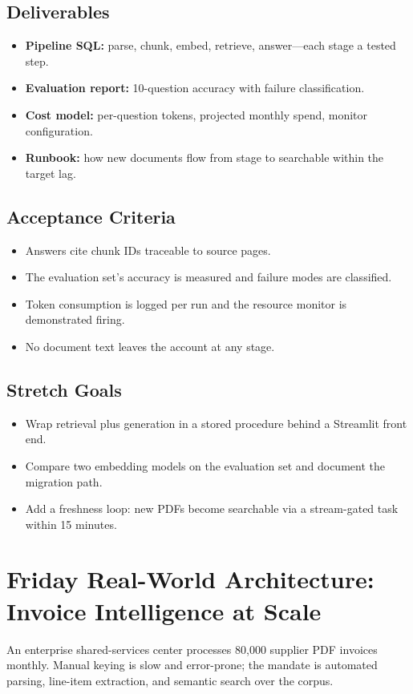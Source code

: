\subsection*{Deliverables}
\begin{itemize}
    \item \textbf{Pipeline SQL:} parse, chunk, embed, retrieve, answer---each stage a tested step.
    \item \textbf{Evaluation report:} 10-question accuracy with failure classification.
    \item \textbf{Cost model:} per-question tokens, projected monthly spend, monitor configuration.
    \item \textbf{Runbook:} how new documents flow from stage to searchable within the target lag.
\end{itemize}

\subsection*{Acceptance Criteria}
\begin{itemize}
    \item Answers cite chunk IDs traceable to source pages.
    \item The evaluation set's accuracy is measured and failure modes are classified.
    \item Token consumption is logged per run and the resource monitor is demonstrated firing.
    \item No document text leaves the account at any stage.
\end{itemize}

\subsection*{Stretch Goals}
\begin{itemize}
    \item Wrap retrieval plus generation in a stored procedure behind a Streamlit front end.
    \item Compare two embedding models on the evaluation set and document the migration path.
    \item Add a freshness loop: new PDFs become searchable via a stream-gated task within 15 minutes.
\end{itemize}

\section{Friday Real-World Architecture: Invoice Intelligence at Scale}
An enterprise shared-services center processes 80{,}000 supplier PDF invoices monthly. Manual keying is slow and error-prone; the mandate is automated parsing, line-item extraction, and semantic search over the corpus.

